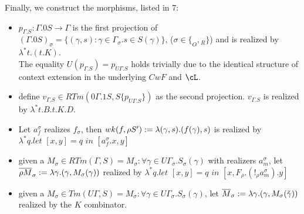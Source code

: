 \documentclass[12pt,a4paper]{article}
\renewcommand{\O}{_{O}}
\newcommand{\R}{\ensuremath{_{R}}}
\begin{document}
Finally, we construct the morphisms, listed in 7:
\begin{itemize}
  \item $p_{\Gamma.S}: \Gamma. 0 S \to \Gamma$ is the first projection of $(\Gamma. 0 S)_\sigma = \{ (\gamma, s) : \gamma \in \Gamma_\sigma. s \in S(\gamma)\}$, ($\sigma \in \{\O, \R \}$) and is realized by $\lambda^* t. (t.K)$.\\
  The equality $U(p_{\Gamma.S}) = p_{U\Gamma.S}$ holds trivially due to the identical structure of context extension in the underlying $CwF$ and $\cL$.
  
  \item define $v_{\Gamma.S} \in RTm(0\Gamma.1S, S\{p_{U\Gamma.S}\})$ as the second projection. $v_{\Gamma.S}$ is realized by $\lambda^* t. B.t.K.D$.
  
  \item Let $a^\sigma_f$ realizes $f_\sigma$, then $wk(f, \rho S') := \lambda (\gamma, s). (f (\gamma), s)$ is realized by $\lambda^* q. \textit{let }[x, y] = q \textit{ in } [a^\sigma_f . x , y]$
  
  \item given a $M_\sigma \in RTm(\Gamma, S) = M_\sigma : \forall \gamma \in U\Gamma_\sigma. S_\sigma(\gamma)$ with realizers $a^\sigma_m$, let $\overline{\rho M}_\sigma := \lambda \gamma. (\gamma, M_\sigma(\gamma))$ realized by $\lambda^* q. \textit{let }[x, y] = q \textit{ in } [x, F_\rho.(!_\rho a^\sigma_m).y]$   
  
  \item given a $M_\sigma \in Tm(U\Gamma, S) = M_\sigma : \forall \gamma \in U\Gamma_\sigma. S_\sigma(\gamma)$, let $\overline{M}_\sigma := \lambda \gamma. (\gamma, M_\sigma(\check\gamma))$ realized by the $K$ combinator.
\end{itemize}
\end{document}

